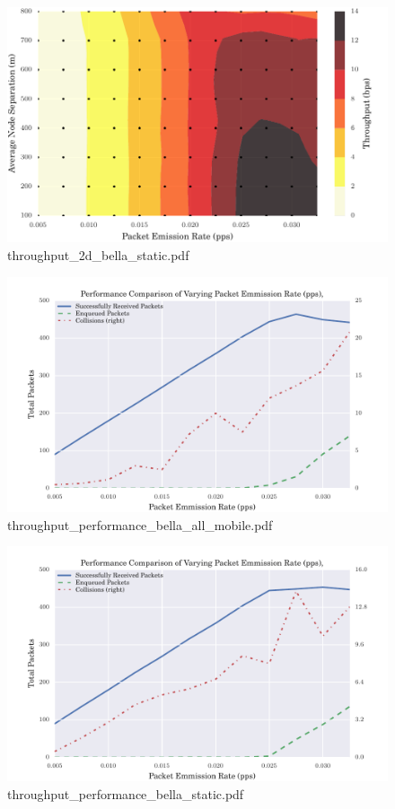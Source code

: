 \documentclass{article}
\begin{document}
\begin{figure}[h!]
\centering
\includegraphics[width=\linewidth]{throughput_2d_bella_static.pdf}
\caption{throughput\_2d\_bella\_static.pdf}
\end{figure}




\begin{figure}[h!]
\centering
\includegraphics[width=\linewidth]{throughput_performance_bella_all_mobile.pdf}
\caption{throughput\_performance\_bella\_all\_mobile.pdf}
\end{figure}




\begin{figure}[h!]
\centering
\includegraphics[width=\linewidth]{throughput_performance_bella_static.pdf}
\caption{throughput\_performance\_bella\_static.pdf}
\end{figure}
\end{document}

